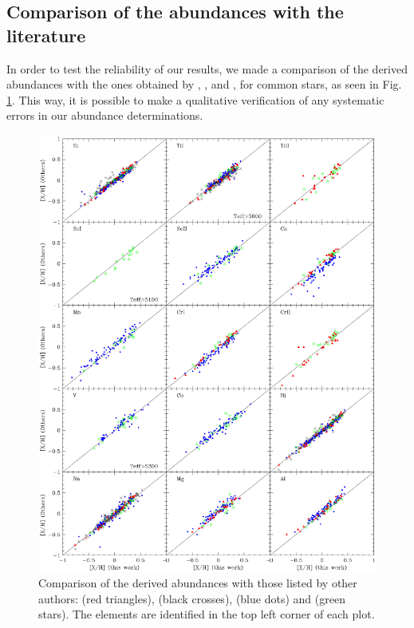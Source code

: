 \documentclass[oldversion]{aa}
\begin{document}
\subsection{Comparison of the abundances with the literature}
\label{sec:comparison}
In order to test the reliability of our results, we made a comparison of the derived abundances with the ones obtained by \citet{Bensby-2005}, \citet{Valenti-2005}, \citet{Gilli-2006} and \citet{Takeda-2007}, for common stars, as seen in Fig. \ref{fig:comparison}. This way, it is possible to make a qualitative verification of any systematic errors in our abundance determinations.

\begin{figure}[h]
\centering
\includegraphics[trim=0cm 1.5cm 0cm 1cm,clip,width=9 cm]{pics/compv2.eps}
\caption[Comparison of abundances with other authors]{Comparison of the derived abundances with those listed by other authors: \citet{Bensby-2005} (red triangles), \citet{Valenti-2005} (black crosses), \citet{Gilli-2006} (blue dots) and \citet{Takeda-2007} (green stars). The elements are identified in the top left corner of each plot.}

\label{fig:comparison}
\end{figure}

\end{document}
